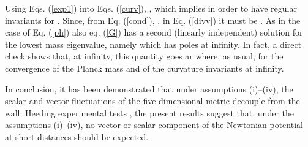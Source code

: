 \documentclass[a4paper,12pt]{article}
\begin{document}
Using Eqs. (\ref{exp1}) into 
Eqs. (\ref{curv}), \coordHE{}, which implies \coordHE{} 
in order to have regular invariants for \coordHE{}.  
Since, from Eq. (\ref{cond}),  \myHighlight{$\beta = 2\alpha$}\coordHE{}, in Eq. (\ref{divv})  
it must be \coordHE{}.
As in the case of Eq. (\ref{ph}) also eq. (\ref{G}) has a second 
(linearly independent) solution for the lowest mass eigenvalue, namely 
\coordHE{} which has poles at infinity.  
In fact, a direct check shows that, at infinity, this quantity
 goes ar \coordHE{} where, as usual, 
\coordHE{} for the convergence of the Planck mass and of the 
curvature invariants at infinity. 

In conclusion, it has been demonstrated that under 
assumptions (i)--(iv), the scalar and vector fluctuations
 of the five-dimensional metric decouple from the wall. 
 Heeding experimental tests \cite{exp}, 
the present results suggest that, under the 
assumptions (i)--(iv), no vector or scalar component of the Newtonian 
potential at short distances should be expected.
\end{document}
